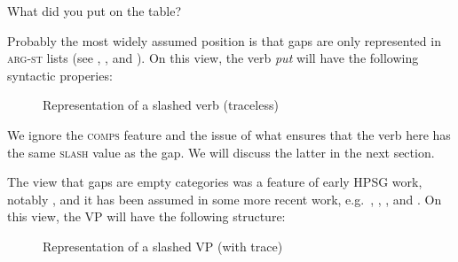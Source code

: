 \documentclass[output=paper
,notxmath 
	        ,collection
	        ,collectionchapter
 	        ,biblatex
                ,babelshorthands
                ,newtxmath
                ,draftmode
                ,colorlinks, citecolor=brown
]{langscibook}
\begin{document}
\begin{exe}
\ex \label{ex:UDC:19}
What did you put \trace{} on the table?
\end{exe}

\noindent
Probably the most widely assumed position is that gaps are only
represented in \textsc{arg-st} lists
(see \citealt[Section~4.1]{Sag:97},
\citealt*[Section~2.2]{Bouma:Malouf:Sag:01},
\citealt[Chapter~5.1]{Ginzburg:Sag:01} and \citealt[508]{Sag:10a}). On
this view, the verb \textit{put} will have the
following syntactic properies:

\begin{figure}
\centering

   \caption{\label{fig:UDC:20}Representation of a slashed verb (traceless)}
\end{figure}


\noindent
We ignore the \textsc{comps} feature and the issue of what ensures that the verb
here has the same \textsc{slash} value as the gap. We will discuss the latter in
the next section.

The view that gaps are empty categories was a feature of early HPSG
work, notably \citet[Chapter~4]{Pollard:Sag:94}, and it has been assumed in some
more recent work, e.g.\ \citet[191,385]{Levine:Hukari:06}, \citet{Borsley:09a},
\citet[Section~4.2]{Borsley:13}, and \citet{Mueller:14b}. On
this view, the VP will have the following structure:

\begin{figure}
{}
    \caption{\label{fig:UDC:21}Representation of a slashed VP (with trace)}  
\end{figure}
\end{document}
